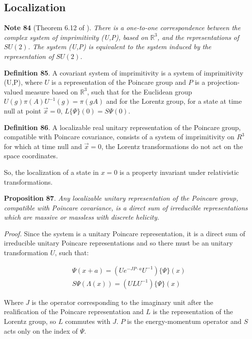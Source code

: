 \documentclass[11pt]{book}
\begin{document}
\hypertarget{localization}{%
\subsection{Localization}\label{localization}}

\textbf{Note 84} (Theorem 6.12 of
\cite{Varadarajan2007Geometry}).
\emph{There is a one-to-one correspondence between the complex system of
imprimitivity (U,P), based on }\(\mathbb{R}^3\)\emph{, and the
representations of }\(SU(2)\)\emph{. The system (U,P) is equivalent to
the system induced by the representation of }\(SU(2)\)\emph{.}

\textbf{Definition 85}. A covariant system of imprimitivity is a system
of imprimitivity (U,P), where \(U\) is a representation of the Poincare
group and \(P\) is a projection-valued measure based on
\(\mathbb{R}^3\), such that for the Euclidean group
\(U(g)\pi(A) U^{-1}(g)=\pi(gA)\) and for the Lorentz group, for a state
at time null at point \(\vec{x}=0\), \(L\{\Psi\}(0)=S\Psi(0)\).

\textbf{Definition 86}. A localizable real unitary representation of the
Poincare group, compatible with Poincare covariance, consists of a
system of imprimitivity on \(R^3\) for which at time null and
\(\vec{x}=0\), the Lorentz transformations do not act on the space
coordinates.

So, the localization of a state in \(x=0\) is a property invariant under
relativistic transformations.

\textbf{Proposition 87}. \emph{Any localizable unitary representation of
the Poincare group, compatible with Poincare covariance, is a direct sum
of irreducible representations which are massive or massless with
discrete helicity.}

\emph{Proof.} Since the system is a unitary Poincare representation, it
is a direct sum of irreducible unitary Poincare representations and so
there must be an unitary transformation \(U\), such that:

\begin{equation}\begin{aligned}
&\Psi(x+a)=(U e^{-J P\cdot a}U^{-1})\{\Psi\}(x)\\
&S\Psi(\Lambda(x))=(U L U^{-1})\{\Psi\}(x)\end{aligned}\end{equation}

Where \(J\) is the operator corresponding to the imaginary unit after
the realification of the Poincare representation and \(L\) is the
representation of the Lorentz group, so \(L\) commutes with \(J\). \(P\)
is the energy-momentum operator and \(S\) acts only on the index of
\(\Psi\).
\end{document}
